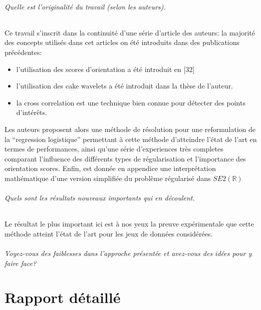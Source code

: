 \documentclass{article}
\begin{document}
\paragraph{Quelle est l'originalité du travail (selon les auteurs).} 
Ce travail s'inscrit dans la continuité d'une  série d'article des auteurs: la majorité
des concepts utilisés dans cet articles on été introduits dans des publications
précédentes:
\begin{itemize}
    \item l'utilisation des scores d'orientation a été introduit en [32]
    \item l'utilisation des cake wavelets a été introduit dans la thèse de l'auteur.
    \item la cross correlation est une technique bien connue pour détecter des points
        d'intérêts.
\end{itemize}
Les auteurs proposent alors une méthode de résolution pour une reformulation de la 
``regression logistique'' permettant à cette méthode d'atteindre l'état de l'art en
termes de performances, ainsi qu'une série d'experiences très completes
comparant l'influence des différents types de régularisation et l'importance des
orientation scores. Enfin, est donnée en appendice une interprétation mathématique d'une
version simplifiée du problème régularisé dans $ SE2(\mathbb{R}) $
\paragraph{Quels sont les résultats nouveaux importants qui en découlent.}
Le résultat le plus important ici est à nos yeux la preuve expérimentale que cette
méthode atteint l'état de l'art pour les jeux de données considérées.
\paragraph{Voyez-vous des faiblesses dans l'approche présentée et avez-vous des idées
pour y faire face?}

\part{Rapport détaillé}
\end{document}
